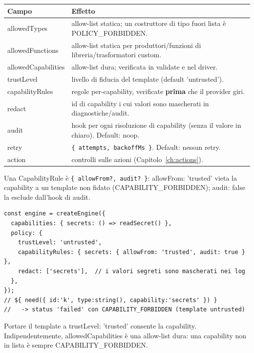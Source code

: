 \documentclass[11pt,a4paper]{book}
\newcommand{\ic}[1]{{\ttfamily #1}}
\theoremstyle{definition}
\begin{document}
{{{{\begin{center}
\small
\begin{tabular}{@{}l p{9.6cm}@{}}
\toprule
\textbf{Campo} & \textbf{Effetto} \\
\midrule
\ic{allowedTypes} & allow-list statica; un costruttore di tipo fuori lista è
\ic{POLICY\_FORBIDDEN}. \\
\ic{allowedFunctions} & allow-list statica per produttori/funzioni di
libreria/trasformatori custom. \\
\ic{allowedCapabilities} & allow-list dura; verificata in \ic{validate} e nel driver. \\
\ic{trustLevel} & livello di fiducia del template (default \ic{'untrusted'}). \\
\ic{capabilityRules} & regole per-capability, verificate \textbf{prima} che il
provider giri. \\
\ic{redact} & id di capability i cui valori sono mascherati in diagnostiche/audit. \\
\ic{audit} & hook per ogni risoluzione di capability (senza il valore in chiaro).
Default: noop. \\
\ic{retry} & \verb|{ attempts, backoffMs }|. Default: nessun retry. \\
\ic{action} & controlli sulle azioni (Capitolo~\ref{ch:actions}). \\
\bottomrule
\end{tabular}
\end{center}

Una \ic{CapabilityRule} è \verb|{ allowFrom?, audit? }|:
\ic{allowFrom: 'trusted'} vieta la capability a un template non fidato
(\ic{CAPABILITY\_FORBIDDEN}); \ic{audit: false} la esclude dall'hook di audit.

\begin{lstlisting}
const engine = createEngine({
  capabilities: { secrets: () => readSecret() },
  policy: {
    trustLevel: 'untrusted',
    capabilityRules: { secrets: { allowFrom: 'trusted', audit: true } },
    redact: ['secrets'],  // i valori segreti sono mascherati nei log
  },
});
// ${ need({ id:'k', type:string(), capability:'secrets' }) }
//   -> status 'failed' con CAPABILITY_FORBIDDEN (template untrusted)
\end{lstlisting}

Portare il template a \ic{trustLevel: 'trusted'} consente la capability.
Indipendentemente, \ic{allowedCapabilities} è una allow-list dura: una capability
non in lista è sempre \ic{CAPABILITY\_FORBIDDEN}.

}}}}
\end{document}

